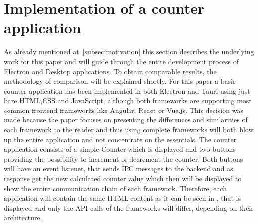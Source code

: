 \section{Implementation of a counter \\ application}
\label{sec:implementation}
As already mentioned at~\ref{subsec:motivation} this section describes the underlying work for this paper and will guide through the entire development process of Electron and Desktop applications.
To obtain comparable results, the methodology of comparison will be explained shortly.
For this paper a basic counter application has been implemented in both Electron and Tauri using just bare \ac{HTML},\ac{CSS} and JavaScript, although both frameworks are supporting most common frontend frameworks like Angular, React or Vue.js.
This decision was made because the paper focuses on presenting the differences and similarities of each framework to the reader and thus using complete frameworks will both blow up the entire application and not concentrate on the essentials.
The counter application consists of a simple Counter which is displayed and two buttons providing the possibility to increment or decrement the counter.
Both buttons will have an event listener, that sends \ac{IPC} messages to the backend and as response get the new calculated counter value which then will be displayed to show the entire communication chain of each framework.
Therefore, each application will contain the same \ac{HTML} content as it can be seen in \figref, that is displayed and only the API calls of the frameworks will differ, depending on their architecture.

